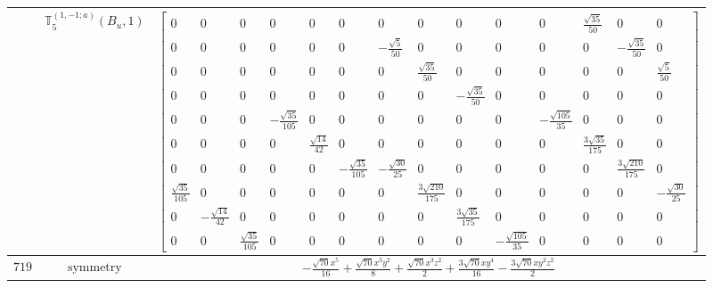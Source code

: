 \documentclass[fleqn,8pt,landscape]{jsarticle}
\begin{document}
\begin{longtable}{ccc}
$  $ & $ \mathbb{T}_{5}^{(1,-1;a)}(B_{u},1) $ & $ \begin{bmatrix} 0 & 0 & 0 & 0 & 0 & 0 & 0 & 0 & 0 & 0 & 0 & \frac{\sqrt{35}}{50} & 0 & 0 \\ 0 & 0 & 0 & 0 & 0 & 0 & - \frac{\sqrt{5}}{50} & 0 & 0 & 0 & 0 & 0 & - \frac{\sqrt{35}}{50} & 0 \\ 0 & 0 & 0 & 0 & 0 & 0 & 0 & \frac{\sqrt{35}}{50} & 0 & 0 & 0 & 0 & 0 & \frac{\sqrt{5}}{50} \\ 0 & 0 & 0 & 0 & 0 & 0 & 0 & 0 & - \frac{\sqrt{35}}{50} & 0 & 0 & 0 & 0 & 0 \\ 0 & 0 & 0 & - \frac{\sqrt{35}}{105} & 0 & 0 & 0 & 0 & 0 & 0 & - \frac{\sqrt{105}}{35} & 0 & 0 & 0 \\ 0 & 0 & 0 & 0 & \frac{\sqrt{14}}{42} & 0 & 0 & 0 & 0 & 0 & 0 & \frac{3 \sqrt{35}}{175} & 0 & 0 \\ 0 & 0 & 0 & 0 & 0 & - \frac{\sqrt{35}}{105} & - \frac{\sqrt{30}}{25} & 0 & 0 & 0 & 0 & 0 & \frac{3 \sqrt{210}}{175} & 0 \\ \frac{\sqrt{35}}{105} & 0 & 0 & 0 & 0 & 0 & 0 & \frac{3 \sqrt{210}}{175} & 0 & 0 & 0 & 0 & 0 & - \frac{\sqrt{30}}{25} \\ 0 & - \frac{\sqrt{14}}{42} & 0 & 0 & 0 & 0 & 0 & 0 & \frac{3 \sqrt{35}}{175} & 0 & 0 & 0 & 0 & 0 \\ 0 & 0 & \frac{\sqrt{35}}{105} & 0 & 0 & 0 & 0 & 0 & 0 & - \frac{\sqrt{105}}{35} & 0 & 0 & 0 & 0 \end{bmatrix} $ \\ \hline
$ 719 $ & $ \text{symmetry} $ & $ - \frac{\sqrt{70} x^{5}}{16} + \frac{\sqrt{70} x^{3} y^{2}}{8} + \frac{\sqrt{70} x^{3} z^{2}}{2} + \frac{3 \sqrt{70} x y^{4}}{16} - \frac{3 \sqrt{70} x y^{2} z^{2}}{2} $ \\

\end{longtable}
\end{document}
